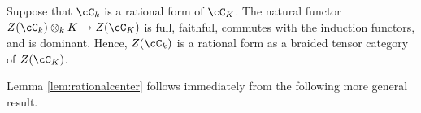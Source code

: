 \begin{lem} \label{lem:rationalcenter}
Suppose that $\cC_k$ is a rational form of $\cC_K$. The natural functor $Z(\cC_k)\otimes_k K \rightarrow Z(\cC_K)$ is full, faithful, commutes with the induction functors, and is dominant.  Hence,  $Z(\cC_k)$ is a rational form as a braided tensor category of $Z(\cC_K)$.
\end{lem}


Lemma \ref{lem:rationalcenter} follows immediately from the following more general result.

